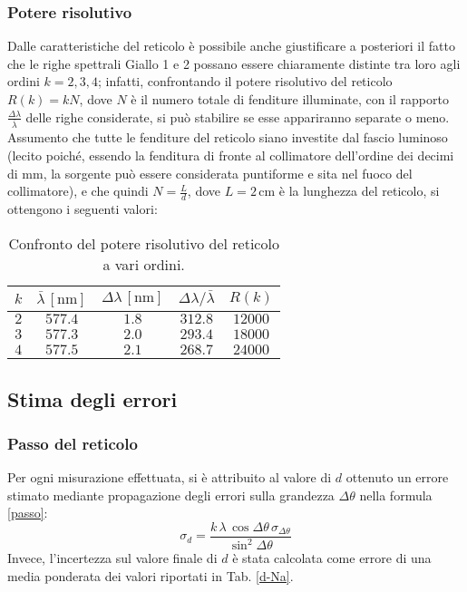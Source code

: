 \documentclass[]{article}
\let\oldsubsection\subsection%
\renewcommand{\subsection}{%
	\renewcommand{\theequation}{\thesubsection.\arabic{equation}}%
	\oldsubsection}%
\begin{document}
    \subsubsection{Potere risolutivo}
    Dalle caratteristiche del reticolo è possibile anche giustificare a posteriori il fatto che le righe spettrali Giallo 1 e 2 possano essere chiaramente distinte tra loro agli ordini $k = 2, 3, 4$; infatti, confrontando il potere risolutivo del reticolo $R(k) = k N$, dove $N$ è il numero totale di fenditure illuminate, con il rapporto $\frac{\Delta\lambda}{\bar{\lambda}}$ delle righe considerate, si può stabilire se esse appariranno separate o meno. \\
    Assumento che tutte le fenditure del reticolo siano investite dal fascio luminoso (lecito poiché, essendo la fenditura di fronte al collimatore dell'ordine dei decimi di mm, la sorgente può essere considerata puntiforme e sita nel fuoco del collimatore), e che quindi $N = \frac{L}{d}$, dove $L = 2 \,\text{cm}$ è la lunghezza del reticolo, si ottengono i seguenti valori:
    \begin{table}[H]
        \centering
        \begin{tabular}{||c|c|c|c|c||}
            \hline
            $k$ & $\bar{\lambda} \, \left[\text{nm}\right]$ & $\Delta\lambda \, \left[\text{nm}\right]$ & $\Delta\lambda/\bar{\lambda}$ & $R(k)$ \\
            \hline\hline
            $2$ & $577.4$ & $1.8$ & $312.8$ & $12000$ \\\hline
            $3$ & $577.3$ & $2.0$ & $293.4$ & $18000$ \\\hline
            $4$ & $577.5$ & $2.1$ & $268.7$ & $24000$ \\\hline
        \end{tabular}
        \caption{Confronto del potere risolutivo del reticolo a vari ordini.}
        \label{R}
    \end{table}

    \subsection{Stima degli errori}
    \subsubsection{Passo del reticolo}
    Per ogni misurazione effettuata, si è attribuito al valore di $d$ ottenuto un errore stimato mediante propagazione degli errori sulla grandezza $\Delta \theta$ nella formula \ref{passo}:
    \begin{equation}
        \label{d-error}
        \sigma_d = \frac{k \, \lambda \, \cos{\Delta\theta} \, \sigma_{\Delta \theta}}{\sin^2{\Delta\theta}}
    \end{equation}
    Invece, l'incertezza sul valore finale di $d$ è stata calcolata come errore di una media ponderata dei valori riportati in Tab. \ref{d-Na}.
    \label{par:errore_passo}
\end{document}
